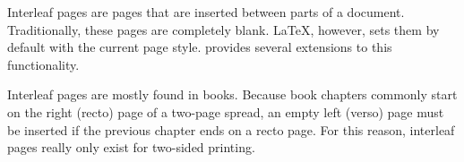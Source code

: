 Interleaf pages are pages that are inserted between parts of a document. 
Traditionally, these pages are completely blank. \LaTeX{}, however, 
sets them by default with the current page style. \KOMAScript{} provides 
several extensions to this functionality.

Interleaf pages are mostly found in books. Because book chapters commonly
start on the right (recto) page of a two-page spread, an empty left (verso)
page must be inserted if the previous chapter ends on a recto page. For this
reason, interleaf pages really only exist for two-sided printing. 
%
\iffalse %
  The blank versos in one-sided printing are not true interleaf pages,
  although they may appear as such in counting the printed sheets.
\fi%

%

